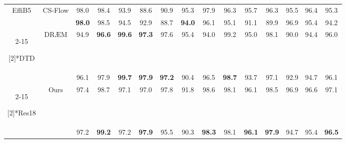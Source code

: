 \begin{table*}[htbp]
{\begin{tabular}{ccccccccccccccc}
\multirow{2}[2]{*}{EffiB5}    & \multirow{2}[2]{*}{CS-Flow\cite{CSFlow}} & 
\cellcolor{green!5} 98.0    & \cellcolor{green!5} 98.4    & \cellcolor{green!5} 93.9    & \cellcolor{green!5} 88.6    & \cellcolor{green!5} 90.9    & \cellcolor{green!5} 95.3    & \cellcolor{green!5} 97.9    & \cellcolor{green!5} 96.3    & \cellcolor{green!5} 95.7    & \cellcolor{green!5} 96.3    & \cellcolor{green!5} 95.5    & \cellcolor{green!5} 96.4    & \cellcolor{green!5} 95.3 \\
& \multicolumn{1}{c}{} & 
\cellcolor{blue!5} \textbf{98.0}  & \cellcolor{blue!5} 98.5  & \cellcolor{blue!5} 94.5  & \cellcolor{blue!5} 92.9  & \cellcolor{blue!5} 88.7  & \cellcolor{blue!5} \textbf{94.0}  & \cellcolor{blue!5} 96.1    & \cellcolor{blue!5} 95.1  & \cellcolor{blue!5} 91.1    & \cellcolor{blue!5} 89.9  & \cellcolor{blue!5} 96.9  & \cellcolor{blue!5} 95.4  & \cellcolor{blue!5} 94.2 \\
\cmidrule{2-15}     

\multirow{2}[2]{*}{DTD}     & \multirow{2}[2]{*}{DRÆM\cite{DRAEM}} & 
\cellcolor{green!5} 94.9 & \cellcolor{green!5} \textbf{96.6}  & \cellcolor{green!5} \textbf{99.6}  & \cellcolor{green!5} \textbf{97.3}  & \cellcolor{green!5} 97.6  & \cellcolor{green!5} 95.4  & \cellcolor{green!5} 94.0  & \cellcolor{green!5} 99.2  & \cellcolor{green!5} 95.0  & \cellcolor{green!5} 98.1  & \cellcolor{green!5} 90.0 & \cellcolor{green!5} 94.4 & \cellcolor{green!5} 96.0 \\
& \multicolumn{1}{c}{} & 
\cellcolor{blue!5} 96.1  & \cellcolor{blue!5} 97.9  & \cellcolor{blue!5} \textbf{99.7}  & \cellcolor{blue!5} \textbf{97.9}  & \cellcolor{blue!5} \textbf{97.2}  & \cellcolor{blue!5} 90.4  & \cellcolor{blue!5} 96.5  & \cellcolor{blue!5} \textbf{98.7}  & \cellcolor{blue!5} 93.7  & \cellcolor{blue!5} 97.1  & \cellcolor{blue!5} 92.9  & \cellcolor{blue!5} 94.7 & \cellcolor{blue!5} 96.1 \\
\cmidrule{2-15}    

\multirow{2}[2]{*}{Res18}     & \multirow{2}[2]{*}{Ours}   & 
\cellcolor{green!5} 97.4  & \cellcolor{green!5} 98.7  & \cellcolor{green!5} 97.1  & \cellcolor{green!5} 97.0 & \cellcolor{green!5} 97.8  & \cellcolor{green!5} 91.8  & \cellcolor{green!5} 98.6  & \cellcolor{green!5} 98.1  & \cellcolor{green!5} 96.1  & \cellcolor{green!5} 98.5  & \cellcolor{green!5} 96.9  & \cellcolor{green!5} 96.6  & \cellcolor{green!5} 97.1 \\
& \multicolumn{1}{c}{} & 
\cellcolor{blue!5} 97.2  & \cellcolor{blue!5} \textbf{99.2}  & \cellcolor{blue!5} 97.2  & \cellcolor{blue!5} \textbf{97.9} & \cellcolor{blue!5} 95.5 & \cellcolor{blue!5} 90.3  & \cellcolor{blue!5} \textbf{98.3}  & \cellcolor{blue!5} 98.1 & \cellcolor{blue!5} \textbf{96.1}  & \cellcolor{blue!5} \textbf{97.9} & \cellcolor{blue!5} 94.7  & \cellcolor{blue!5} 95.4  & \cellcolor{blue!5} \textbf{96.5} \\
\bottomrule

\end{tabular}



   
    }

    \label{tab3}\end{table*}


